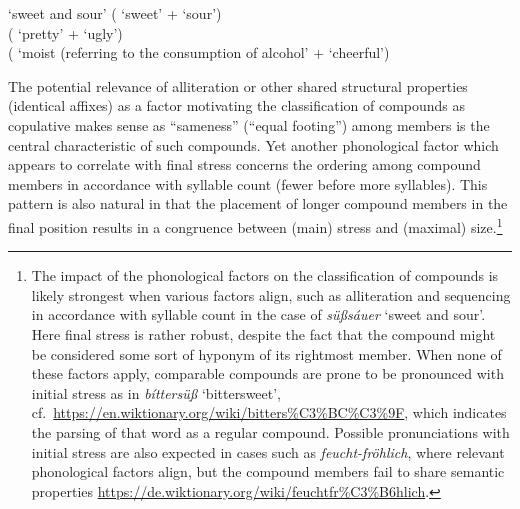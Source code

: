 \documentclass[output=paper
 ,nobabel
 ,draftmode
 ,colorlinks, citecolor=brown
]{langscibook}
\begin{document}
\ea\label{ex-süßsauer}
 `sweet and sour' ( `sweet' +  `sour') \\ 
 ( `pretty' +  `ugly')\\  
 ( `moist (referring to the consumption of alcohol' +  `cheerful') \\ 

\z

\largerpage[2] 
\noindent
The potential relevance of alliteration or other shared structural properties (\eg identical affixes) as a factor motivating the classification of compounds as copulative makes sense as ``sameness'' (``equal footing'') among members is the central characteristic of such compounds. Yet another phonological factor which appears to correlate with final stress concerns the ordering among compound members in accordance with syllable count (fewer before more syllables). This pattern is also natural in that the placement of longer compound members in the final position results in a congruence between (main) stress and (maximal) size.\footnote{The impact of the phonological factors on the classification of compounds is likely strongest when various factors align, such as alliteration and sequencing in accordance with syllable count in the case of \emph{süßsáuer} `sweet and sour'. Here final stress is rather robust, despite the fact that the compound might be considered some sort of hyponym of its rightmost member. When none of these factors apply, comparable compounds are prone to be pronounced with initial stress as in \emph{bíttersüß} `bittersweet', cf.\ \url{https://en.wiktionary.org/wiki/bitters\%C3\%BC\%C3\%9F}, which indicates the parsing of that word as a regular compound. Possible pronunciations with initial stress are also expected in cases such as \emph{feucht-fröhlich}, where relevant phonological factors align, but the compound members fail to share semantic properties
\url{https://de.wiktionary.org/wiki/feuchtfr\%C3\%B6hlich}.}
\end{document}
